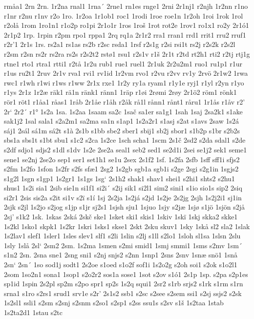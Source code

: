 rmåa1
2rn
2rn.
1r2na
rnal1
1rna´
2rne1
rn1es
rnge1
2rni
2r1nj1
r2njh
1r2nn
r1no
r1nr
r2nu
r1nv
r2o
1ro.
1r2oa
1r1ob1
roc1
1rodi
1roe
roe1n
1r2oh
1roi
1rok
1rol
r2olå
1rom
1ro1n1
r1o2p
ro1pi
2r1o1r
1ros
1roš
1rot
rot2e
1rov1
ro1x1
ro2y
2r1ó1
2r1p2
1rp.
1rpin
r2pm
rpo1
rppa1
2rq
rq1a
2r1r2
rra1
rran1
rrd1
rrit1
rru2
rruf1
r2r'1
2r1s
1rs.
rs2a1
rs1as
rs2b
r2sc
rsda1
1rsf
r2s1g
r2si
rsi1t
rs2j
r2s2k
r2s2l
r2sm
r2sn
rs2r
rs2ra
rs2s
r2s2t2
rstø1
rsu1
r2s1v
r1š
2r1t
r2td
rt2h1
rti2
r2tj
rtj1g
rtne1
rto1
rtra1
rtti1
r2tå
1r2u
rub1
rue1
ruel1
2r1uk
2r2u2m1
ruo1
ru1p1
r1ur
r1us
ru2t1
2ruv
2r1v
rva1
rvi1
rv1id
1r2vm
rvo1
r2vu
r2vv
rv1y
2rvö
2r1w2
1rwa
rwc1
r1wh
r1wi
r1ws
r1ww
2r1x
rxe1
1r2y
ry1a
ryam1
r1y1e
ryj1
r1yl
r2yn
r1yo
r1ys
2r1z
1r2æ
räk1
rä1n
ränk1
ränn1
1räp
r1øi
2rømi
2røy
2r1ö2
röm1
rönk1
rör1
röt1
r1åa1
råas1
1råb
2r1åe
r1åh
r2åk
rå1l
rånn1
rånt1
råru1
1r1ås
r1åv
r2'
2r`
2r2´
r1°
1s2a
1sa.
1s2aa
1saam
sa2c
1sač
sa1er
sa1g1
1sah
1saj
2sa2k1
s1ake
sak1j2
1sal
sala1
s2a2m1
sa2ma
sa1n
s1ap1
1s2a2r1
s1asj
s2at
s1avs
2saw
1s2á
sáj1
2sál
sá1m
sá2t
s1à
2s1b
s1bb
sbe2
sber1
sbij1
sb2j
sbor1
s1b2p
s1br
s2b2s
sbs1a
sbs1t
s1bt
sbu1
s1c2
s2ca
1s2ce
1sch
scha1
1scm
2s1č
2sd2
s2da
sdal1
s2de
s2df
sdjo1
sdjs2
s1dl
s1dv
1s2e
2se2a
seal1
seb2
sed1
se2d1i
2sei
se1j2
sek1
seme1
sene1
se2nj
2se2o
sep1
ser1
set1h1
se1u
2sex
2s1f2
1sf.
1s2fa
2sfb
1sff
sff1i
sfjs2
s2fm
1s2fo
1sfon
1s2fr
s2fs
sfæ1
2sg2
1s2gb
sgb1a
sgb1i
s2ge
2sgi
s2g1in
1sgjs2
s1g2l
1sgn
s1gp1
1s2gr1
1s1gs
1sg`
2s1h2
shak1
shav1
shei1
s2hi1
shts2
s2hu1
shus1
1s2i
sia1
2sib
sie1n
si1f1
si2i´
s2ij
sik1
si2l1
sim2
sini1
s1io
sio1s
sip2
2siq
si2r1
2sis
sis2a
s2it
si1v
s2ï
s1í
1sj
2s2ja
1s2já
s2jd
1s2je
2s2jg
2sjh
1s2j2i1
sj1in
2sjk
s2jl
1s2jo
s2jog
s1jp
s1jr
sj2s1
1sjsh
sju1
1sjuo
1sjy
s2jæ
1sjø
s1jö
1sjön
s2jå
2sj'
s1k2
1sk.
1skas
2ská
2skč
ske1
1sket
ski1
skis1
1skiv
1skï
1skj
skka2
skke1
1s2kl
1sko1
skpk1
1s2kr
1skri
1sks1
skse1
2skt
2sku
skuv1
1sky
1skå
sl2
sla2
1slak
1s2lav1
slef1
1sler1
1sles
slev1
slf1
s2li
1slin
s2lj
s1ll
s2lo1
1sloh
sl1sa
1slsn
2slu
1sly
1slå
2sl`
2sm2
2sm.
1s2ma
1smen
s2mi
smid1
1smj
smmi1
1sms
s2mv
1sm´
s1n2
2sn.
2sna
sne1
2sng
sni1
s2nj
snjs2
s2nn
1snp1
2sns
2snv
1snæ
snö1
1snå
2sn`
2sn´
1so
sod1j
sodt1
2s2oe
s1oed
s1o2f
sof1i
1s2o2g
s2oh
soi1
s2ok
s1o2l1
2som
1so2n1
sona1
1sop1
s2o2r2
sos1a
sose1
1sot
s2ov
s1ó1
2s1p
1sp.
s2pa
s2p1es
sp1id
1spin
2s2pl
sp2m
s2po
spr1
sp2s
1s2q
squi1
2sr2
s1rb
srjs2
s1rk
s1rm
s1rn
srna1
s1ro
s2rs1
srud1
srv1e
s2r'
2s1s2
ssb1
s2sc
s2see
s2sem
ssi1
s2sj
ssjs2
s2sk
1s2sl1
ssli1
s2sm
s2snj
s2snm
s2so1
s2sp1
s2ss
ssu1s
s2sv
s1š
1s2taa
1stab
1s2ta2d1
1stau
s2tc
